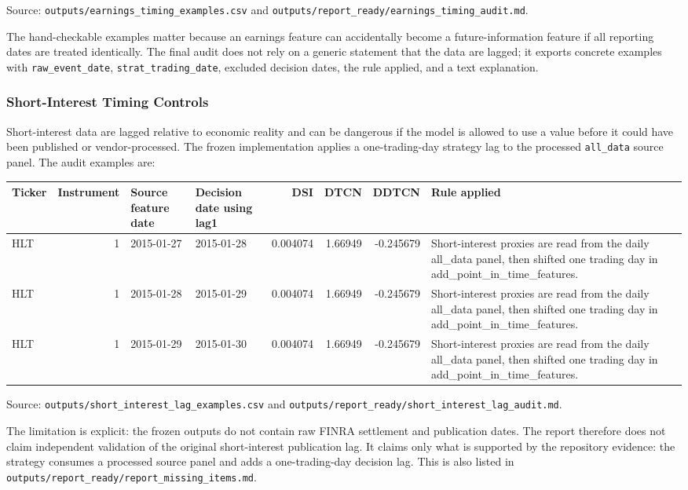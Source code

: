 \documentclass[
]{article}
\begin{document}
Source: \texttt{outputs/earnings\_timing\_examples.csv} and
\texttt{outputs/report\_ready/earnings\_timing\_audit.md}.

The hand-checkable examples matter because an earnings feature can
accidentally become a future-information feature if all reporting dates
are treated identically. The final audit does not rely on a generic
statement that the data are lagged; it exports concrete examples with
\texttt{raw\_event\_date}, \texttt{strat\_trading\_date}, excluded
decision dates, the rule applied, and a text explanation.

\hypertarget{short-interest-timing-controls}{%
\subsubsection{Short-Interest Timing
Controls}\label{short-interest-timing-controls}}

Short-interest data are lagged relative to economic reality and can be
dangerous if the model is allowed to use a value before it could have
been published or vendor-processed. The frozen implementation applies a
one-trading-day strategy lag to the processed \texttt{all\_data} source
panel. The audit examples are:

\begin{longtable}[]{@{}lrllrrrl@{}}
\toprule
Ticker & Instrument & Source feature date & Decision date using lag1 &
DSI & DTCN & DDTCN & Rule applied \\
\midrule
\endhead
HLT & 1 & 2015-01-27 & 2015-01-28 & 0.004074 & 1.66949 & -0.245679 &
Short-interest proxies are read from the daily all\_data panel, then
shifted one trading day in add\_point\_in\_time\_features. \\
HLT & 1 & 2015-01-28 & 2015-01-29 & 0.004074 & 1.66949 & -0.245679 &
Short-interest proxies are read from the daily all\_data panel, then
shifted one trading day in add\_point\_in\_time\_features. \\
HLT & 1 & 2015-01-29 & 2015-01-30 & 0.004074 & 1.66949 & -0.245679 &
Short-interest proxies are read from the daily all\_data panel, then
shifted one trading day in add\_point\_in\_time\_features. \\
\bottomrule
\end{longtable}

Source: \texttt{outputs/short\_interest\_lag\_examples.csv} and
\texttt{outputs/report\_ready/short\_interest\_lag\_audit.md}.

The limitation is explicit: the frozen outputs do not contain raw FINRA
settlement and publication dates. The report therefore does not claim
independent validation of the original short-interest publication lag.
It claims only what is supported by the repository evidence: the
strategy consumes a processed source panel and adds a one-trading-day
decision lag. This is also listed in
\texttt{outputs/report\_ready/report\_missing\_items.md}.
\end{document}

